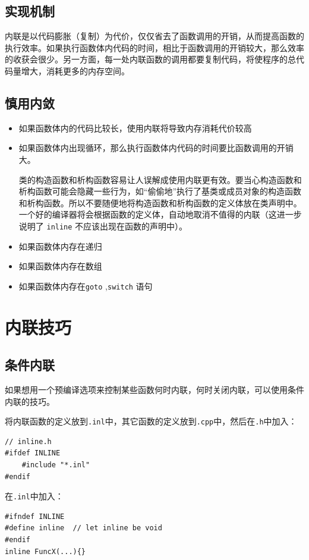 \documentclass[UTF8,a4paper,12pt]{ctexbook} %
\begin{document}
	       \subsection{实现机制}内联是以代码膨胀（复制）为代价，仅仅省去了函数调用的开销，从而提高函数的执行效率。如果执行函数体内代码的时间，相比于函数调用的开销较大，那么效率的收获会很少。另一方面，每一处内联函数的调用都要复制代码，将使程序的总代码量增大，消耗更多的内存空间。
       
	       \subsection{慎用内敛}
		       \begin{itemize}
		       	\item  如果函数体内的代码比较长，使用内联将导致内存消耗代价较高
		       	\item  如果函数体内出现循环，那么执行函数体内代码的时间要比函数调用的开销大。
       	
		       	类的构造函数和析构函数容易让人误解成使用内联更有效。要当心构造函数和析构函数可能会隐藏一些行为，如“偷偷地”执行了基类或成员对象的构造函数和析构函数。所以不要随便地将构造函数和析构函数的定义体放在类声明中。一个好的编译器将会根据函数的定义体，自动地取消不值得的内联（这进一步说明了 \verb|inline| 不应该出现在函数的声明中）。
		       	\item 如果函数体内存在递归
		       	\item 如果函数体内存在数组
		       	\item 如果函数体内存在\verb|goto| ,\verb|switch| 语句
		       \end{itemize}
     
    \section{内联技巧}
	    \subsection{条件内联}
		    如果想用一个预编译选项来控制某些函数何时内联，何时关闭内联，可以使用条件内联的技巧。
		    
		    将内联函数的定义放到\verb|.inl|中，其它函数的定义放到\verb|.cpp|中，然后在\verb|.h|中加入：
		    \begin{lstlisting}
// inline.h
#ifdef INLINE
	#include "*.inl"
#endif
		    \end{lstlisting}
		    
		    在\verb|.inl|中加入：
		    \begin{lstlisting}
#ifndef INLINE
#define inline  // let inline be void
#endif
inline FuncX(...){}
		    \end{lstlisting}
		    
\end{document}
